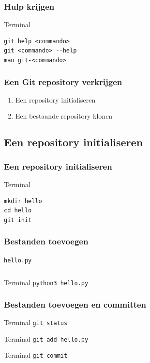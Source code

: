 \documentclass[]{beamer}
\begin{document}
\begin{frame}[fragile]
    \frametitle{Hulp krijgen}

    \begin{block}{Terminal}
\begin{verbatim}
git help <commando>
git <commando> --help
man git-<commando>
\end{verbatim}
    \end{block}
\end{frame}

\begin{frame}
    \frametitle{Een Git repository verkrijgen}

    \begin{enumerate}
        \item Een repository initialiseren
        \item Een bestaande repository klonen
    \end{enumerate}
\end{frame}

\subsection{Een repository initialiseren}

\begin{frame}[fragile]
    \frametitle{Een repository initialiseren}

    \begin{block}{Terminal}
\begin{verbatim}
mkdir hello
cd hello
git init
\end{verbatim}
    \end{block}
\end{frame}

\begin{frame}[fragile]
    \frametitle{Bestanden toevoegen}

    \texttt{hello.py}
    \inputminted[bgcolor=monokaibg]{python}{source/hello.py}

    \vspace{10 mm}

    \begin{block}{Terminal}
    \verb/python3 hello.py/
    \end{block}
\end{frame}

\begin{frame}[fragile]
    \frametitle{Bestanden toevoegen en committen}

    \begin{block}{Terminal}
    \verb/git status/
    \end{block}

    \pause

    \begin{block}{Terminal}
    \verb/git add hello.py/
    \end{block}

    \pause

    \begin{block}{Terminal}
    \verb/git commit/
    \end{block}
\end{frame}
\end{document}
